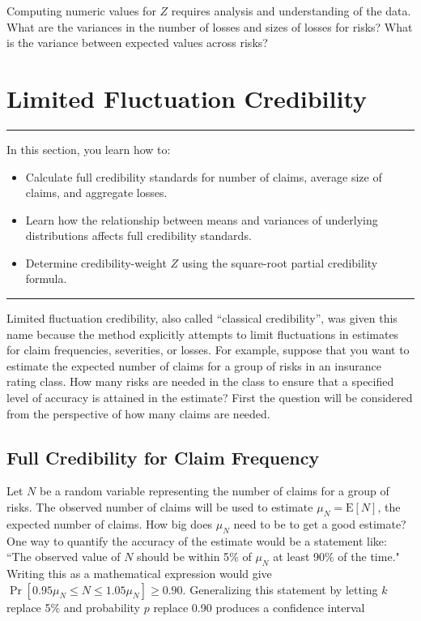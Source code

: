 \documentclass[]{book}
\providecommand{\tightlist}{%
  \setlength{\itemsep}{0pt}\setlength{\parskip}{0pt}}
\theoremstyle{definition}
\theoremstyle{definition}
\theoremstyle{definition}
\theoremstyle{remark}
\begin{document}
Computing numeric values for \(Z\) requires analysis and understanding
of the data. What are the variances in the number of losses and sizes of
losses for risks? What is the variance between expected values across
risks?

\section{Limited Fluctuation
Credibility}\label{limited-fluctuation-credibility}

\begin{center}\rule{0.5\linewidth}{\linethickness}\end{center}

In this section, you learn how to:

\begin{itemize}
\tightlist
\item
  Calculate full credibility standards for number of claims, average
  size of claims, and aggregate losses.
\item
  Learn how the relationship between means and variances of underlying
  distributions affects full credibility standards.
\item
  Determine credibility-weight \(Z\) using the square-root partial
  credibility formula.
\end{itemize}

\begin{center}\rule{0.5\linewidth}{\linethickness}\end{center}

Limited fluctuation credibility, also called ``classical credibility'',
was given this name because the method explicitly attempts to limit
fluctuations in estimates for claim frequencies, severities, or losses.
For example, suppose that you want to estimate the expected number of
claims for a group of risks in an insurance rating class. How many risks
are needed in the class to ensure that a specified level of accuracy is
attained in the estimate? First the question will be considered from the
perspective of how many claims are needed.

\subsection{Full Credibility for Claim Frequency}\label{S:frequency}

Let \(N\) be a random variable representing the number of claims for a
group of risks. The observed number of claims will be used to estimate
\(\mu_N=\mathrm{E}[N]\), the expected number of claims. How big does
\(\mu_N\) need to be to get a good estimate? One way to quantify the
accuracy of the estimate would be a statement like: ``The observed value
of \(N\) should be within 5\(\%\) of \(\mu_N\) at least 90\(\%\) of the
time." Writing this as a mathematical expression would give
\(\Pr[0.95\mu_N\leq N \leq1.05\mu_N] \geq 0.90\). Generalizing this
statement by letting \(k\) replace 5\(\%\) and probability \(p\) replace
0.90 produces a confidence interval
\end{document}
